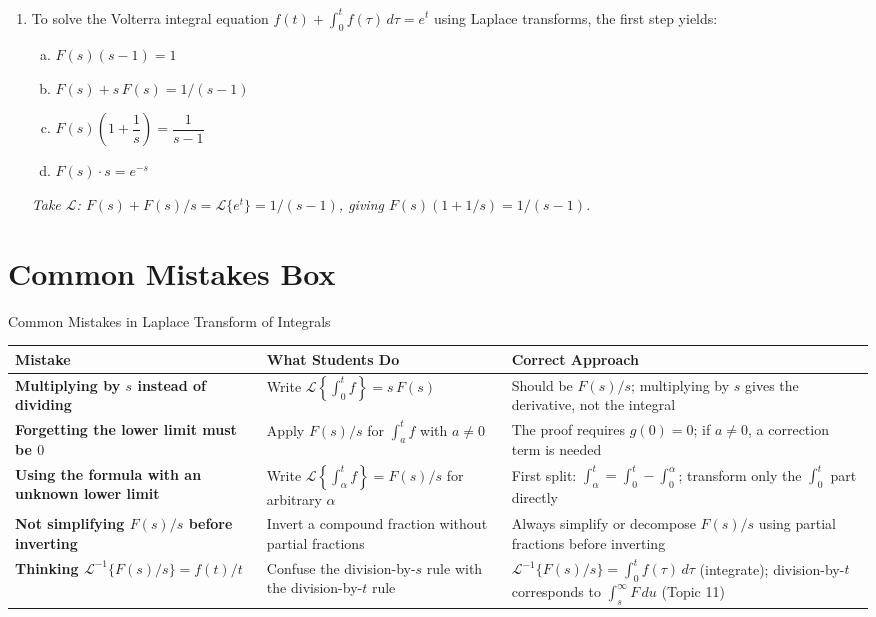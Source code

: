 \documentclass[12pt,a4paper]{article}
\begin{document}
\begin{enumerate}[label=\textbf{MCQ \arabic*.}, leftmargin=*, itemsep=14pt]
\item To solve the Volterra integral equation
  $f(t) + \displaystyle\int_0^t f(\tau)\,d\tau = e^t$
  using Laplace transforms, the first step yields:
  \begin{enumerate}[(a)]
    \item $F(s)(s-1) = 1$
    \item $F(s) + s\,F(s) = 1/(s-1)$
    \item \textbf{$F(s)\!\left(1 + \dfrac{1}{s}\right) = \dfrac{1}{s-1}$}
    \item $F(s)\cdot s = e^{-s}$
  \end{enumerate}
  \textit{Take $\mathcal{L}$: $F(s) + F(s)/s = \mathcal{L}\{e^t\} = 1/(s-1)$, giving
  $F(s)(1+1/s) = 1/(s-1)$.}

\end{enumerate}

\section{Common Mistakes Box}

\begin{mistakebox}{Common Mistakes in Laplace Transform of Integrals}
\begin{tabular}{>{\bfseries}p{4.5cm} p{4.5cm} p{4.5cm}}
\toprule
Mistake & What Students Do & Correct Approach \\
\midrule
Multiplying by $s$ instead of dividing &
  Write $\mathcal{L}\!\left\{\int_0^t f\right\} = s\,F(s)$ &
  Should be $F(s)/s$; multiplying by $s$ gives the derivative, not the integral \\
\addlinespace
Forgetting the lower limit must be $0$ &
  Apply $F(s)/s$ for $\int_a^t f$ with $a \neq 0$ &
  The proof requires $g(0) = 0$; if $a \neq 0$, a correction term is needed \\
\addlinespace
Using the formula with an unknown lower limit &
  Write $\mathcal{L}\!\left\{\int_\alpha^t f\right\} = F(s)/s$ for arbitrary $\alpha$ &
  First split: $\int_\alpha^t = \int_0^t - \int_0^\alpha$; transform only the
  $\int_0^t$ part directly \\
\addlinespace
Not simplifying $F(s)/s$ before inverting &
  Invert a compound fraction without partial fractions &
  Always simplify or decompose $F(s)/s$ using partial fractions before inverting \\
\addlinespace
Thinking $\mathcal{L}^{-1}\{F(s)/s\} = f(t)/t$ &
  Confuse the division-by-$s$ rule with the division-by-$t$ rule &
  $\mathcal{L}^{-1}\{F(s)/s\} = \int_0^t f(\tau)\,d\tau$ (integrate); division-by-$t$
  corresponds to $\int_s^\infty F\,du$ (Topic 11) \\
\bottomrule
\end{tabular}
\end{mistakebox}
\end{document}
